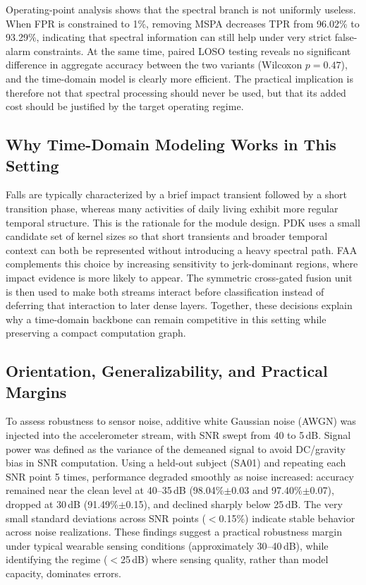 \documentclass[jec]{acnsart}
\begin{document}
Operating-point analysis shows that the spectral branch is not uniformly useless. When FPR is constrained to 1\%, removing MSPA decreases TPR from 96.02\% to 93.29\%, indicating that spectral information can still help under very strict false-alarm constraints. At the same time, paired LOSO testing reveals no significant difference in aggregate accuracy between the two variants (Wilcoxon $p{=}0.47$), and the time-domain model is clearly more efficient. The practical implication is therefore not that spectral processing should never be used, but that its added cost should be justified by the target operating regime.

\subsection{Why Time-Domain Modeling Works in This Setting}

Falls are typically characterized by a brief impact transient followed by a short transition phase, whereas many activities of daily living exhibit more regular temporal structure. This is the rationale for the module design. PDK uses a small candidate set of kernel sizes so that short transients and broader temporal context can both be represented without introducing a heavy spectral path. FAA complements this choice by increasing sensitivity to jerk-dominant regions, where impact evidence is more likely to appear. The symmetric cross-gated fusion unit is then used to make both streams interact before classification instead of deferring that interaction to later dense layers. Together, these decisions explain why a time-domain backbone can remain competitive in this setting while preserving a compact computation graph.

\subsection{Orientation, Generalizability, and Practical Margins}

To assess robustness to sensor noise, additive white Gaussian noise (AWGN) was injected into the accelerometer stream, with SNR swept from 40 to 5\,dB. Signal power was defined as the variance of the demeaned signal to avoid DC/gravity bias in SNR computation. Using a held-out subject (SA01) and repeating each SNR point 5 times, performance degraded smoothly as noise increased: accuracy remained near the clean level at 40--35\,dB (98.04\%$\pm$0.03 and 97.40\%$\pm$0.07), dropped at 30\,dB (91.49\%$\pm$0.15), and declined sharply below 25\,dB. The very small standard deviations across SNR points ($<$0.15\%) indicate stable behavior across noise realizations. These findings suggest a practical robustness margin under typical wearable sensing conditions (approximately 30--40\,dB), while identifying the regime ($<$25\,dB) where sensing quality, rather than model capacity, dominates errors.
\end{document}

